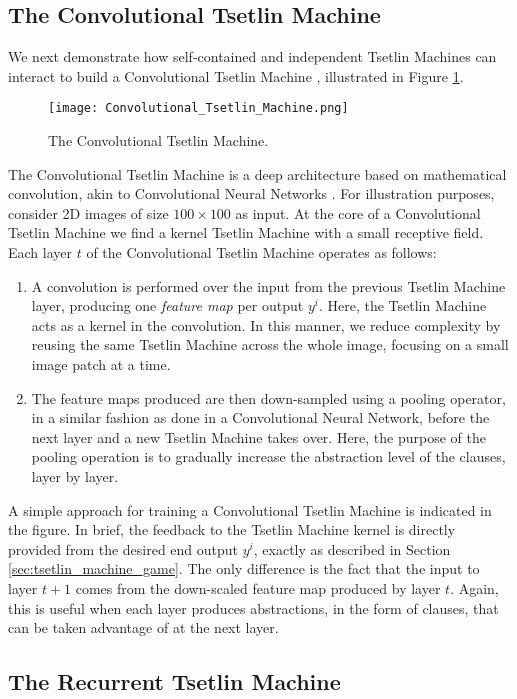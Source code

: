 \documentclass[11pt,a4paper]{article}
\begin{document}
\subsection{The Convolutional Tsetlin Machine}

We next demonstrate how self-contained and independent Tsetlin Machines can interact to build a Convolutional Tsetlin Machine \cite{Granmo2018d}, illustrated in Figure \ref{figure:convolutional_tsetlin_machine}.
\begin{figure}[!th]
\centering
\texttt{[image: Convolutional\_Tsetlin\_Machine.png]}
\caption{The Convolutional Tsetlin Machine.}
\label{figure:convolutional_tsetlin_machine}
\end{figure}
The Convolutional Tsetlin Machine is a deep architecture based on mathematical convolution, akin to Convolutional Neural Networks \cite{LeCun1998}. For illustration purposes, consider 2D images of size $100 \times 100$ as input. At the core of a Convolutional Tsetlin Machine we find a kernel Tsetlin Machine with a small receptive field. Each layer $t$ of the Convolutional Tsetlin Machine operates as follows:
\begin{enumerate}
    \item A convolution is performed over the input from the previous Tsetlin Machine layer, producing one \emph{feature map} per output $y^i$. Here, the Tsetlin Machine acts as a kernel in the convolution. In this manner, we reduce complexity by reusing the same Tsetlin Machine across the whole image, focusing on a small image patch at a time.  
    \item The feature maps produced are then down-sampled using a pooling operator, in a similar fashion as done in a Convolutional Neural Network,  before the next layer and a new Tsetlin Machine takes over. Here, the purpose of the pooling operation is to gradually increase the abstraction level of the clauses, layer by layer.
\end{enumerate}
A simple approach for training a Convolutional Tsetlin Machine is indicated in the figure. In brief, the feedback to the Tsetlin Machine kernel is directly provided from the desired end output $y^i$, exactly as described in Section \ref{sec:tsetlin_machine_game}. The only difference is the fact that the input to layer $t+1$ comes from the down-scaled feature map produced by layer $t$. Again, this is useful when each layer produces abstractions, in the form of clauses, that can be taken advantage of at the next layer.

\subsection{The Recurrent Tsetlin Machine}
\end{document}
